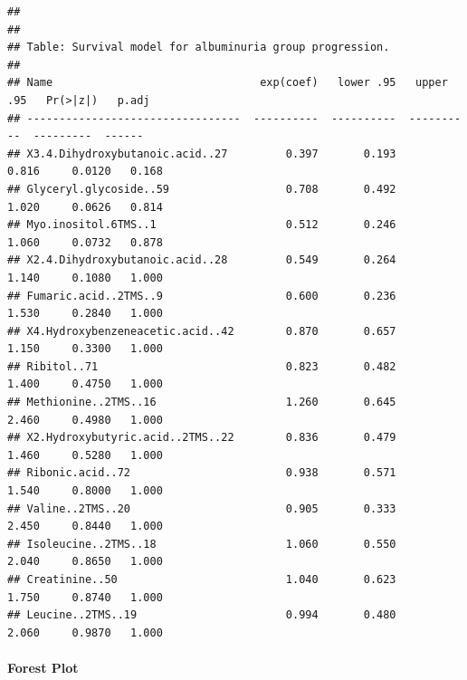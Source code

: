 \documentclass[]{article}
\let\oldparagraph\paragraph
\renewcommand{\paragraph}[1]{\oldparagraph{#1}\mbox{}}
\begin{document}
\begin{verbatim}
## 
## 
## Table: Survival model for albuminuria group progression.
## 
## Name                                exp(coef)   lower .95   upper .95   Pr(>|z|)   p.adj
## ---------------------------------  ----------  ----------  ----------  ---------  ------
## X3.4.Dihydroxybutanoic.acid..27         0.397       0.193       0.816     0.0120   0.168
## Glyceryl.glycoside..59                  0.708       0.492       1.020     0.0626   0.814
## Myo.inositol.6TMS..1                    0.512       0.246       1.060     0.0732   0.878
## X2.4.Dihydroxybutanoic.acid..28         0.549       0.264       1.140     0.1080   1.000
## Fumaric.acid..2TMS..9                   0.600       0.236       1.530     0.2840   1.000
## X4.Hydroxybenzeneacetic.acid..42        0.870       0.657       1.150     0.3300   1.000
## Ribitol..71                             0.823       0.482       1.400     0.4750   1.000
## Methionine..2TMS..16                    1.260       0.645       2.460     0.4980   1.000
## X2.Hydroxybutyric.acid..2TMS..22        0.836       0.479       1.460     0.5280   1.000
## Ribonic.acid..72                        0.938       0.571       1.540     0.8000   1.000
## Valine..2TMS..20                        0.905       0.333       2.450     0.8440   1.000
## Isoleucine..2TMS..18                    1.060       0.550       2.040     0.8650   1.000
## Creatinine..50                          1.040       0.623       1.750     0.8740   1.000
## Leucine..2TMS..19                       0.994       0.480       2.060     0.9870   1.000
\end{verbatim}

\newpage

\hypertarget{forest-plot-1}{%
\paragraph{Forest Plot}\label{forest-plot-1}}
\end{document}

